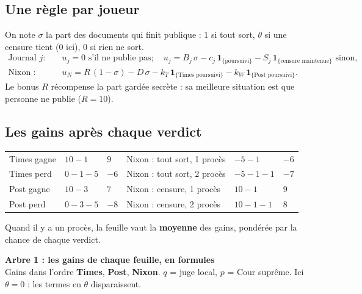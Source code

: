 \documentclass[11pt,a4paper]{article}
\theoremstyle{definition}
\newcommand{\ind}[1]{\mathbf{1}_{\{\text{#1}\}}}
\newcommand{\T}[1]{\textcolor{nyt}{#1}}
\newcommand{\W}[1]{\textcolor{wp}{#1}}
\newcommand{\N}[1]{\textcolor{gov}{#1}}
\begin{document}
\subsection{Une règle par joueur}
On note $\sigma$ la part des documents qui finit publique : $1$ si tout sort, $\theta$ si une censure tient ($0$ ici), $0$ si rien ne sort.
\begin{align*}
\text{Journal } j :\quad & u_j=0 \text{ s'il ne publie pas} ;\quad u_j=B_j\,\sigma-c_j\,\ind{poursuivi}-S_j\,\ind{censure maintenue}\text{ sinon,}\\
\text{Nixon :}\quad & u_N=R\,(1-\sigma)-D\,\sigma-k_T\,\ind{Times poursuivi}-k_W\,\ind{Post poursuivi}.
\end{align*}
Le bonus $R$ récompense la part gardée secrète : sa meilleure situation est que personne ne publie ($R=10$).

\subsection{Les gains après chaque verdict}
\begin{center}
\small
\begin{tabular}{@{}lll@{\qquad}lll@{}}
\toprule
\T{Times gagne} & $10-1$ & $9$ & \N{Nixon : tout sort, 1 procès} & $-5-1$ & $-6$ \\
\T{Times perd} & $0-1-5$ & $-6$ & \N{Nixon : tout sort, 2 procès} & $-5-1-1$ & $-7$ \\
\W{Post gagne} & $10-3$ & $7$ & \N{Nixon : censure, 1 procès} & $10-1$ & $9$ \\
\W{Post perd} & $0-3-5$ & $-8$ & \N{Nixon : censure, 2 procès} & $10-1-1$ & $8$ \\
\bottomrule
\end{tabular}
\end{center}
Quand il y a un procès, la feuille vaut la \textbf{moyenne} des gains, pondérée par la chance de chaque verdict.

\begin{landscape}
\begin{center}{\large\bfseries Arbre 1 : les gains de chaque feuille, en formules}\\[2pt]{\small Gains dans l'ordre \textcolor{nyt}{\textbf{Times}}, \textcolor{wp}{\textbf{Post}}, \textcolor{gov}{\textbf{Nixon}}. $q$ = juge local, $p$ = Cour suprême. Ici $\theta=0$ : les termes en $\theta$ disparaissent.}\end{center}\vspace{-4pt}
\noindent\resizebox{\linewidth}{!}{}
\end{landscape}
\end{document}
